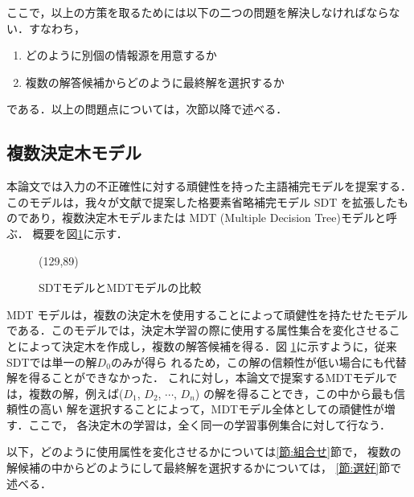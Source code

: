 ここで，以上の方策を取るためには以下の二つの問題を解決しなければならな
い．すなわち，
\vspace*{\baselineskip}

\begin{enumerate}
\item どのように別個の情報源を用意するか
\item 複数の解答候補からどのように最終解を選択するか
\end{enumerate}
\vspace*{\baselineskip}

\noindent
である．以上の問題点については，次節以降で述べる．


\subsection{複数決定木モデル}

本論文では入力の不正確性に対する頑健性を持った主語補完モデルを提案する．
このモデルは，我々が文献\cite{主語補完}で提案した格要素省略補完モデル 
SDT を拡張したものであり，複数決定木モデルまたは MDT (Multiple
Decision Tree)モデルと呼ぶ．
概要を図{}\ref{fig:mdt-model}に示す．

\begin{figure}
\begin{center}
    \begin{epsf}
    \end{epsf}
    \begin{draft}
    \atari(129,89)
    \end{draft}
\caption{SDTモデルとMDTモデルの比較}
\label{fig:mdt-model}
\end{center}
\end{figure}

MDT モデルは，複数の決定木を使用することによって頑健性を持たせたモデル
である．このモデルでは，決定木学習の際に使用する属性集合を変化させるこ
とによって決定木を作成し，複数の解答候補を得る．図
{}\ref{fig:mdt-model}に示すように，従来SDTでは単一の解$D_0$のみが得ら
れるため，この解の信頼性が低い場合にも代替解を得ることができなかった．
これに対し，本論文で提案するMDTモデルでは，複数の解，例えば($D_1$,
$D_2$, $\cdots$, $D_n$) の解を得ることでき，この中から最も信頼性の高い
解を選択することによって，MDTモデル全体としての頑健性が増す．ここで，
各決定木の学習は，全く同一の学習事例集合に対して行なう．

以下，どのように使用属性を変化させるかについては{}\ref{節:組合せ}節で，
複数の解候補の中からどのようにして最終解を選択するかについては，
{}\ref{節:選好}節で述べる．
\vspace{2\baselineskip}


